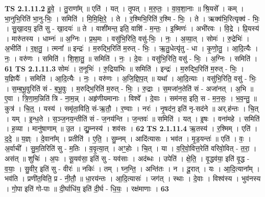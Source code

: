 \documentclass[17pt]{extarticle}
\begin{document}
                  \newline
                                \textbf{ TS 2.1.11.2} \newline
                  हु॒वे॒ । तु॒राणा᳚म् ॥ एति॑ । यत् । तृ॒पत् । म॒रु॒तः॒ । वा॒व॒शा॒नाः ॥ श्रि॒यसे᳚ । कम् । भा॒नुभि॒रिति॑ भा॒नु-भिः॒ । समिति॑ । मि॒मि॒क्षि॒रे॒ । ते । र॒श्मिभि॒रिति॑ र॒श्मि - भिः॒ । ते । ऋक्व॑भि॒रित्यृक्व॑ - भिः॒ । सु॒खा॒दय॒ इति॑ सु - खा॒दयः॑ ॥ ते । वाशी॑मन्त॒ इति॒ वाशि॑ - म॒न्तः॒ । इ॒ष्मिणः॑ । अभी॑रवः । वि॒द्रे । प्रि॒यस्य॑ । मारु॑तस्य । धाम्नः॑ ॥ अ॒ग्निः । प्र॒थ॒मः । वसु॑भि॒रिति॒ वसु॑-भिः॒ । नः॒ । अ॒व्या॒त् । सोमः॑ । रु॒द्रेभिः॑ । अ॒भीति॑ । र॒क्ष॒तु॒ । त्मना᳚ ॥ इन्द्रः॑ । म॒रुद्भि॒रिति॑ म॒रुत् - भिः॒ । ऋ॒तु॒धेत्यृ॑तु - धा । कृ॒णो॒तु॒ । आ॒दि॒त्यैः । नः॒ । वरु॑णः । समिति॑ । शि॒शा॒तु॒ ॥ समिति॑ । नः॒ । दे॒वः । वसु॑भि॒रिति॒ वसु॑ - भिः॒ । अ॒ग्निः । समिति॑ । \textbf{  61} \newline
                  \newline
                                \textbf{ TS 2.1.11.3} \newline
                  सोमः॑ । त॒नूभिः॑ । रु॒द्रिया॑भिः ॥ समिति॑ । इन्द्रः॑ । म॒रुद्भि॒रिति॑ म॒रुत् - भिः॒ । य॒ज्ञियैः᳚ । समिति॑ । आ॒दि॒त्यैः । नः॒ । वरु॑णः । अ॒जि॒ज्ञि॒प॒त् ॥ यथा᳚ । आ॒दि॒त्याः । वसु॑भि॒रिति॒ वसु॑ - भिः॒ । स॒म्ब॒भू॒वुरिति॑ सं - ब॒भू॒वुः । म॒रुद्भि॒रिति॑ म॒रुत् - भिः॒ । रु॒द्राः । स॒मजा॑न॒तेति॑ सं - अजा॑नत् । अ॒भि ॥ ए॒वा । त्रि॒णा॒म॒न्निति॑ त्रि - ना॒म॒न्न् । अहृ॑णीयमानाः । विश्वे᳚ । दे॒वाः । सम॑नस॒ इति॒ स - म॒न॒सः॒ । भ॒व॒न्तु॒ ॥ कुत्र॑ । चि॒त्॒ । यस्य॑ । समृ॑ता॒विति॒ सं-ऋ॒तौ॒ । र॒ण्वाः । नरः॑ । नृ॒षद॑न॒ इति॑ नृ-सद॑ने ॥ अर्.ह॑न्तः । चि॒त् । यम् । इ॒न्ध॒ते । स॒ञ्ज॒नय॒न्तीति॑ सं - ज॒नय॑न्ति । ज॒न्तवः॑ ॥ समिति॑ । यत् । इ॒षः । वना॑महे । समिति॑ । ह॒व्या । मानु॑षाणाम् ॥ उ॒त । द्यु॒म्नस्य॑ । शव॑सः । \textbf{  62} \newline
                  \newline
                                \textbf{ TS 2.1.11.4} \newline
                  ऋ॒तस्य॑ । र॒श्मिम् । एति॑ । द॒दे॒ ॥ य॒ज्ञ्ः । दे॒वाना᳚म् । प्रतीति॑ । ए॒ति॒ । सु॒म्नम् । आदि॑त्यासः । भव॑त । मृ॒ड॒यन्तः॑ ॥ एति॑ । वः॒ । अ॒र्वाची᳚ । सु॒म॒तिरिति॑ सु - म॒तिः । व॒वृ॒त्या॒त् । अꣳ॒॒होः । चि॒त् । या । व॒रि॒वो॒वित्त॒रेति॑ वरिवो॒वित् - त॒रा॒ । अस॑त् ॥ शुचिः॑ । अ॒पः । सू॒यव॑सा॒ इति॑ सु - यव॑साः । अद॑ब्धः । उपेति॑ । क्षे॒ति॒ । वृ॒द्धव॑या॒ इति॑ वृ॒द्ध - व॒याः॒ । सु॒वीर॒ इति॑ सु - वीरः॑ ॥ नकिः॑ । तम् । घ्न॒न्ति॒ । अन्ति॑तः । न । दू॒रात् । यः । आ॒दि॒त्याना᳚म् । भव॑ति । प्रणी॑त॒विति॒ प्र - नी॒तौ॒ ॥ धा॒रय॑न्तः । आ॒दि॒त्यासः॑ । जग॑त् । स्थाः । दे॒वाः । विश्व॑स्य । भुव॑नस्य । गो॒पा इति॑ गो-पाः ॥ दी॒र्घाधि॑य॒ इति॑ दी॒र्घ - धि॒यः॒ । रक्ष॑माणाः । \textbf{  63} \newline
\end{document}
